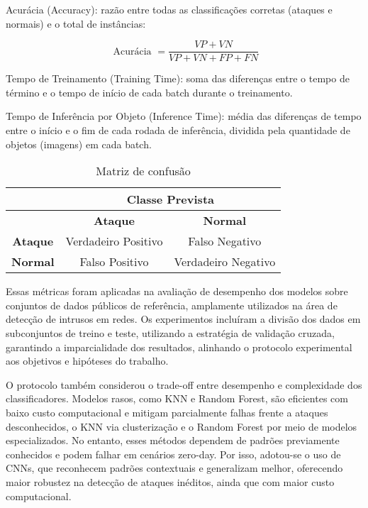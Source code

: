 \documentclass[conference]{IEEEtran}
\begin{document}
    Acurácia (Accuracy): razão entre todas as classificações corretas (ataques e normais) e o total de instâncias:

    \begin{equation}
    \text { Acurácia }=\frac{V P+V N}{V P+V N+F P+F N}
    \end{equation}
    \hspace{1cm}

    Tempo de Treinamento (Training Time): soma das diferenças entre o tempo de término e o tempo de início de cada batch durante o treinamento.
    
    Tempo de Inferência por Objeto (Inference Time): média das diferenças de tempo entre o início e o fim de cada rodada de inferência, dividida pela quantidade de objetos (imagens) em cada batch.
    

    \begin{table}[h]
        \centering
        \renewcommand{\arraystretch}{1.4}
        \begin{tabular}{|c|c|c|}
            \hline
            \rowcolor{gray!30}
            \multicolumn{1}{|c|}{} & \multicolumn{2}{c|}{\textbf{Classe Prevista}} \\ \hline
            \rowcolor{gray!30}
            \textbf & \textbf{Ataque} & \textbf{Normal} \\ \hline
            \textbf{Ataque} & Verdadeiro Positivo & Falso Negativo \\ \hline
            \textbf{Normal} & Falso Positivo & Verdadeiro Negativo \\ \hline
        \end{tabular}
        \caption{Matriz de confusão}
        \label{tab:matriz-confusao}
    \end{table}


    Essas métricas foram aplicadas na avaliação de desempenho dos modelos sobre conjuntos de dados públicos de referência, amplamente utilizados na área de detecção de intrusos em redes. Os experimentos incluíram a divisão dos dados em subconjuntos de treino e teste, utilizando a estratégia de validação cruzada, garantindo a imparcialidade dos resultados, alinhando o protocolo experimental aos objetivos e hipóteses do trabalho.
    
    O protocolo também considerou o trade-off entre desempenho e complexidade dos classificadores. Modelos rasos, como KNN e Random Forest, são eficientes com baixo custo computacional e mitigam parcialmente falhas frente a ataques desconhecidos, o KNN via clusterização e o Random Forest por meio de modelos especializados. No entanto, esses métodos dependem de padrões previamente conhecidos e podem falhar em cenários zero-day. Por isso, adotou-se o uso de CNNs, que reconhecem padrões contextuais e generalizam melhor, oferecendo maior robustez na detecção de ataques inéditos, ainda que com maior custo computacional.
\end{document}
